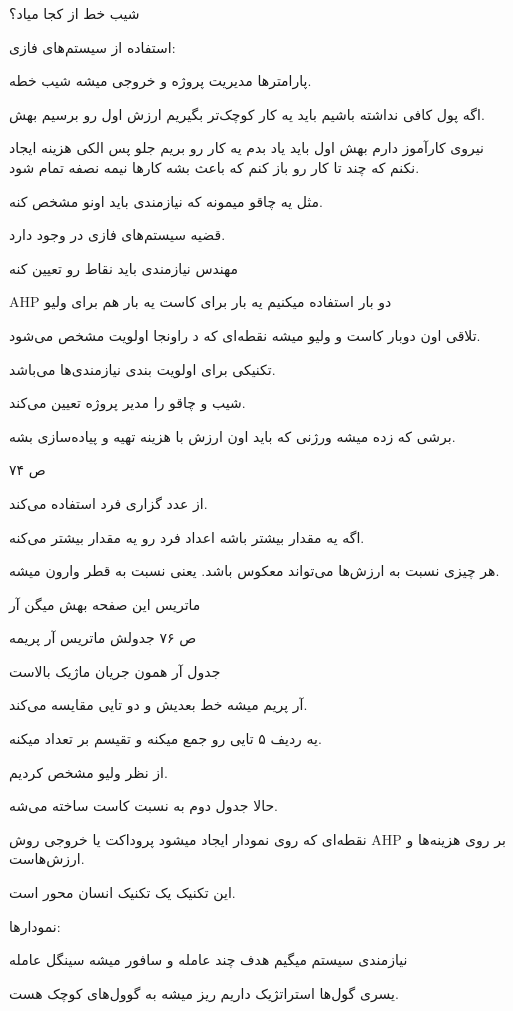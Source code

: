 شیب خط از کجا میاد؟

استفاده از سیستم‌های فازی:

پارامتر‌ها مدیریت پروژه و خروجی میشه شیب خطه.

اگه پول کافی نداشته باشیم باید یه کار کوچک‌تر بگیریم ارزش اول رو برسیم بهش.

نیروی کارآموز دارم بهش اول باید یاد بدم یه کار رو بریم جلو پس الکی هزینه ایجاد
نکنم که چند تا کار رو باز کنم که باعث بشه کار‌ها نیمه نصفه تمام شود.

مثل یه چاقو میمونه که نیازمندی باید اونو مشخص کنه.

قضیه سیستم‌های فازی در  وجود دارد.

مهندس نیازمندی باید نقاط رو تعیین کنه

AHP
دو بار استفاده میکنیم یه بار برای کاست یه بار هم برای ولیو

تلاقی اون دوبار کاست و ولیو میشه نقطه‌ای که د راونجا اولویت مشخص می‌شود.

تکنیکی برای اولویت بندی نیازمندی‌ها می‌باشد.

شیب و چاقو را مدیر پروژه تعیین می‌کند.

برشی که زده میشه ورژنی که باید اون ارزش با هزینه تهیه و پیاده‌سازی بشه.

ص ۷۴

از عدد گزاری فرد استفاده می‌کند.

اگه یه مقدار بیشتر باشه اعداد فرد رو یه مقدار بیشتر می‌کنه.

هر چیزی نسبت به ارزش‌ها می‌تواند معکوس باشد. یعنی نسبت به قطر وارون میشه.

ماتریس این صفحه بهش میگن آر

ص ۷۶ جدولش ماتریس آر پریمه

جدول آر همون جریان ماژیک بالاست

آر پریم میشه خط بعدیش و دو تایی مقایسه می‌کند.

یه ردیف ۵ تایی رو جمع میکنه و تقیسم بر تعداد میکنه.

از نظر ولیو مشخص کردیم.

حالا جدول دوم به نسبت کاست ساخته می‌شه.

نقطه‌ای که روی نمودار ایجاد میشود پروداکت یا خروجی روش AHP بر روی هزینه‌ها و
ارزش‌هاست.

این تکنیک یک تکنیک انسان محور است.

نمودار‌ها:

نیازمندی سیستم میگیم هدف چند عامله
و سافور میشه سینگل عامله

یسری گول‌ها استراتژیک داریم ریز میشه به گوول‌های کوچک هست.

